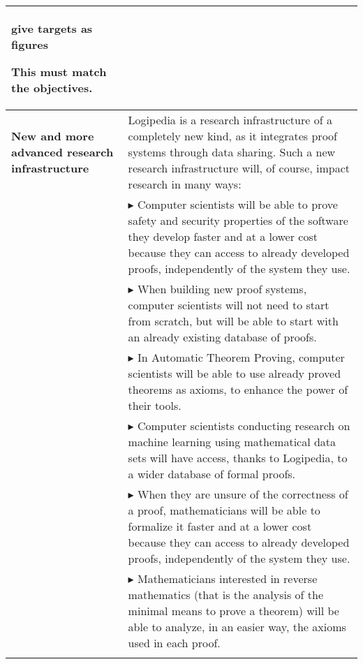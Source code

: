 \begin{longtable}{|p{}|p{}|}
{\color{red} give targets as figures}

This must match the objectives. 

\\
\hline
{\bf New and more advanced research infrastructure}
&
Logipedia is a research
infrastructure of a completely new kind, as it integrates proof systems
through data sharing. Such a new research infrastructure will, of
course, impact research in many ways:
\\
&
$\blacktriangleright$ Computer scientists
will be able to prove safety and security
  properties of the software they develop faster and at a lower cost
  because they can access to already developed proofs, independently
  of the system they use.
\\
&
$\blacktriangleright$ When building new proof systems, computer scientists will not
  need to start from scratch, but will be able to start with an already
  existing database of proofs.
\\
&
$\blacktriangleright$ In Automatic Theorem Proving, computer scientists will be able
  to use already proved theorems as axioms, to enhance the power of
  their tools.
\\
&
$\blacktriangleright$ Computer scientists conducting research on machine learning
using mathematical data sets will have access, thanks to Logipedia,
to a wider database of formal proofs.
\\
&
$\blacktriangleright$ When they are unsure of the correctness of a proof,
  mathematicians will be able to formalize it faster and at a lower
  cost because they can access to already developed proofs,
  independently of the system they use.
\\
&
$\blacktriangleright$
Mathematicians interested in reverse mathematics (that is the analysis
of the minimal means to prove a theorem) will be able to analyze, in
an easier way, the axioms used in each proof.
\\
&


\end{longtable}
